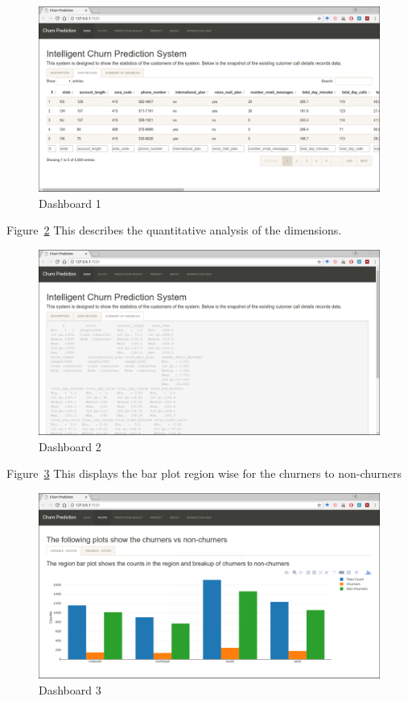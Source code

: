 		\begin{figure}[H]
			\caption{Dashboard 1}
			\label{icpcr-1}
			\hspace*{-3cm}
			\includegraphics[scale=0.5]{progress_presentaion/ppt_figures/icpcr_1_dash.png}
		\end{figure}
		\newpage
Figure~\ref{icpcr-2} This describes the quantitative analysis of the dimensions.
		\begin{figure}[H]
			\caption{Dashboard 2}
			\label{icpcr-2}
			\hspace*{-2cm}
			\includegraphics[scale=0.4]{progress_presentaion/ppt_figures/icpcr_2_dash.png}
		\end{figure}
		\newpage
Figure~\ref{icpcr-3} This displays the bar plot region wise for the churners to non-churners
		\begin{figure}[H]
			\caption{Dashboard 3}
			\label{icpcr-3}
			\hspace*{-2cm}
			\includegraphics[scale=0.4]{progress_presentaion/ppt_figures/icpcr_3_dash.png}
		\end{figure}

